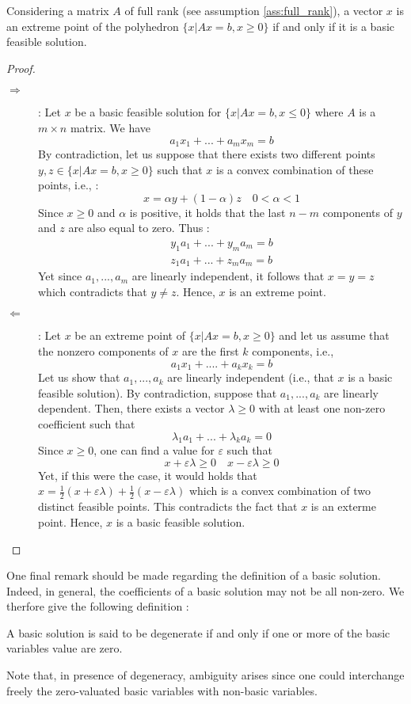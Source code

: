 \begin{theorem}
    Considering a matrix $A$ of full rank (see assumption \ref{ass:full_rank}), a vector $x$ is an extreme point of the polyhedron $\{x|Ax=b, x\ge 0\}$ if and only if it is a basic feasible solution.
\end{theorem}
\begin{proof}\leavevmode
    \begin{description}
        \item[$\Rightarrow$] : Let $x$ be a basic feasible solution for $\{ x | Ax = b, x\le 0 \}$ where $A$ is a $m\times n$ matrix. We have \[ a_1x_1 + ... + a_mx_m = b \] By contradiction, let us suppose that there exists two different points $y,z\in\{x|Ax=b,x\ge 0\}$ such that $x$ is a convex combination of these points, i.e., : \[ x = \alpha y + (1 - \alpha) z \quad 0<\alpha<1 \] Since $x\ge 0$ and $\alpha$ is positive, it holds that the last $n-m$ components of $y$ and $z$ are also equal to zero. Thus :
        \begin{align*} 
            y_1a_1 + ... + y_ma_m = b\\
            z_1a_1 + ... + z_ma_m = b
        \end{align*} Yet since $a_1,...,a_m$ are linearly independent, it follows that $x=y=z$ which contradicts that $y\ne z$. Hence, $x$ is an extreme point.
        \item[$\Leftarrow$] : Let $x$ be an extreme point of $\{ x | Ax = b, x\ge 0 \}$ and let us assume that the nonzero components of $x$ are the first $k$ components, i.e., \[ a_1x_1 + .... + a_kx_k = b \] Let us show that $a_1,...,a_k$ are linearly independent (i.e., that $x$ is a basic feasible solution). By contradiction, suppose that $a_1,...,a_k$ are linearly dependent. Then, there exists a vector $\lambda \ge 0$ with at least one non-zero coefficient such that \[ \lambda_1a_1 + ... + \lambda_ka_k = 0 \] Since $x\ge 0$, one can find a value for $\varepsilon$ such that \[ x + \varepsilon\lambda\ge 0\quad x-\varepsilon\lambda \ge 0 \] Yet, if this were the case, it would holds that $x = \frac 12 (x + \varepsilon\lambda) + \frac 12(x-\varepsilon\lambda)$ which is a convex combination of two distinct feasible points. This contradicts the fact that $x$ is an exterme point. Hence, $x$ is a basic feasible solution. 
    \end{description}
\end{proof}

One final remark should be made regarding the definition of a basic solution. Indeed, in general, the coefficients of a basic solution may not be all non-zero. We therfore give the following definition :
\begin{definition}
    A basic solution is said to be degenerate if and only if one or more of the basic variables value are zero.
\end{definition}
Note that, in presence of degeneracy, ambiguity arises since one could interchange freely the zero-valuated basic variables with non-basic variables.

